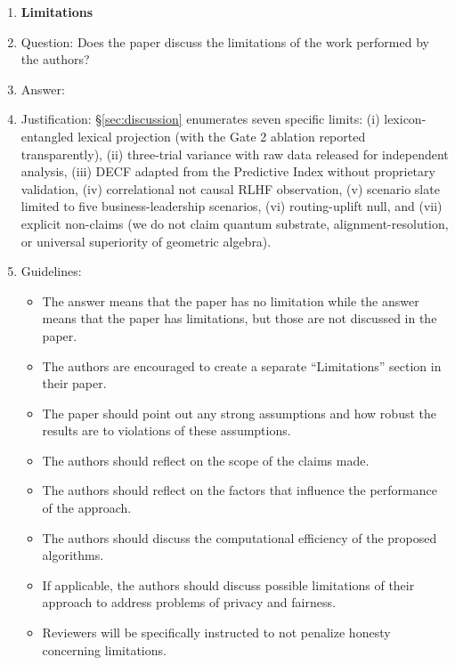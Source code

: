 \begin{enumerate}
\item {\bf Limitations}
    \item[] Question: Does the paper discuss the limitations of the work performed by the authors?
    \item[] Answer: \answerYes{}
    \item[] Justification: \S\ref{sec:discussion} enumerates seven specific limits: (i) lexicon-entangled lexical projection (with the Gate 2 ablation reported transparently), (ii) three-trial variance with raw data released for independent analysis, (iii) DECF adapted from the Predictive Index without proprietary validation, (iv) correlational not causal RLHF observation, (v) scenario slate limited to five business-leadership scenarios, (vi) routing-uplift null, and (vii) explicit non-claims (we do not claim quantum substrate, alignment-resolution, or universal superiority of geometric algebra).
    \item[] Guidelines:
    \begin{itemize}
        \item The answer \answerNA{} means that the paper has no limitation while the answer \answerNo{} means that the paper has limitations, but those are not discussed in the paper.
        \item The authors are encouraged to create a separate ``Limitations'' section in their paper.
        \item The paper should point out any strong assumptions and how robust the results are to violations of these assumptions.
        \item The authors should reflect on the scope of the claims made.
        \item The authors should reflect on the factors that influence the performance of the approach.
        \item The authors should discuss the computational efficiency of the proposed algorithms.
        \item If applicable, the authors should discuss possible limitations of their approach to address problems of privacy and fairness.
        \item Reviewers will be specifically instructed to not penalize honesty concerning limitations.
    \end{itemize}


\end{enumerate}
